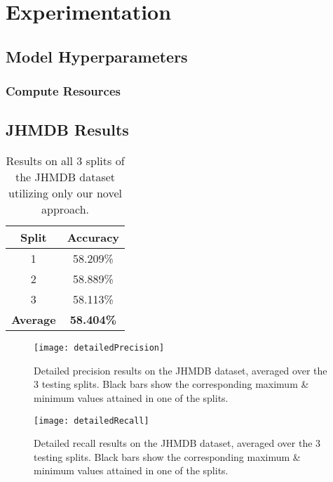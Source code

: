 
\chapter{Experimentation} %

\label{Experimentation} %

\section{Model Hyperparameters}

\subsection{Compute Resources}

\section{JHMDB Results}

\begin{table}[h]
	\centering
	\begin{tabular}{||c c||} 
		\hline
		\textbf{Split} & \textbf{Accuracy} \\ [0.5ex] 
		\hline\hline
		1 & 58.209\% \\ 
		\hline
		2 & 58.889\% \\
		\hline
		3 & 58.113\% \\
		\hline
		\hline
		\textbf{Average} & \textbf{58.404\%} \\
		\hline
	\end{tabular}
	\label{tab:acc-results}
	\caption{Results on all 3 splits of the JHMDB dataset utilizing only our novel approach.}
\end{table}

\begin{figure}[h]
	\texttt{[image: detailedPrecision]}
	\centering
	\caption{Detailed precision results on the JHMDB dataset, averaged over the 3 testing splits. Black bars show the corresponding maximum \& minimum values attained in one of the splits.}
	\label{fig:detailed-precision}
\end{figure}

\begin{figure}[h]
	\texttt{[image: detailedRecall]}
	\centering
	\caption{Detailed recall results on the JHMDB dataset, averaged over the 3 testing splits. Black bars show the corresponding maximum \& minimum values attained in one of the splits.}
	\label{fig:detailed-recall}
\end{figure}

